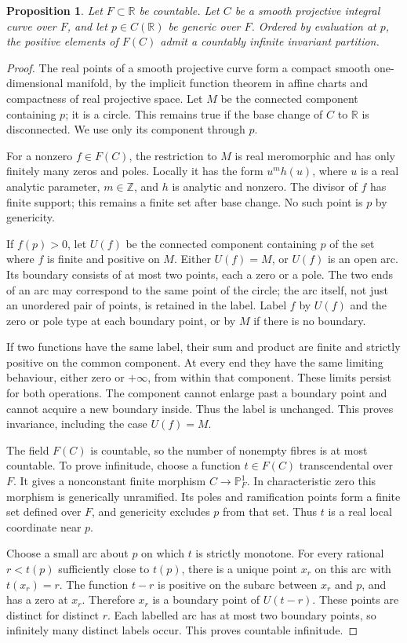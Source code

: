 \documentclass[11pt]{article}
\newtheorem{proposition}[theorem]{Proposition}
\theoremstyle{remark}
\newcommand{\R}{\mathbb R}
\begin{document}
\begin{proposition}\label{prop:curve}
Let $F\subset\R$ be countable. Let $C$ be a smooth projective integral curve over $F$, and let $p\in C(\R)$ be generic over $F$. Ordered by evaluation at $p$, the positive elements of $F(C)$ admit a countably infinite invariant partition.
\end{proposition}
\begin{proof}
The real points of a smooth projective curve form a compact smooth one-dimensional manifold, by the implicit function theorem in affine charts and compactness of real projective space. Let $M$ be the connected component containing $p$; it is a circle. This remains true if the base change of $C$ to $\R$ is disconnected. We use only its component through $p$.

For a nonzero $f\in F(C)$, the restriction to $M$ is real meromorphic and has only finitely many zeros and poles. Locally it has the form $u^m h(u)$, where $u$ is a real analytic parameter, $m\in\mathbb Z$, and $h$ is analytic and nonzero. The divisor of $f$ has finite support; this remains a finite set after base change. No such point is $p$ by genericity.

If $f(p)>0$, let $U(f)$ be the connected component containing $p$ of the set where $f$ is finite and positive on $M$. Either $U(f)=M$, or $U(f)$ is an open arc. Its boundary consists of at most two points, each a zero or a pole. The two ends of an arc may correspond to the same point of the circle; the arc itself, not just an unordered pair of points, is retained in the label. Label $f$ by $U(f)$ and the zero or pole type at each boundary point, or by $M$ if there is no boundary.

If two functions have the same label, their sum and product are finite and strictly positive on the common component. At every end they have the same limiting behaviour, either zero or $+\infty$, from within that component. These limits persist for both operations. The component cannot enlarge past a boundary point and cannot acquire a new boundary inside. Thus the label is unchanged. This proves invariance, including the case $U(f)=M$.

The field $F(C)$ is countable, so the number of nonempty fibres is at most countable. To prove infinitude, choose a function $t\in F(C)$ transcendental over $F$. It gives a nonconstant finite morphism $C\to\mathbb P^1_F$. In characteristic zero this morphism is generically unramified. Its poles and ramification points form a finite set defined over $F$, and genericity excludes $p$ from that set. Thus $t$ is a real local coordinate near $p$.

Choose a small arc about $p$ on which $t$ is strictly monotone. For every rational $r<t(p)$ sufficiently close to $t(p)$, there is a unique point $x_r$ on this arc with $t(x_r)=r$. The function $t-r$ is positive on the subarc between $x_r$ and $p$, and has a zero at $x_r$. Therefore $x_r$ is a boundary point of $U(t-r)$. These points are distinct for distinct $r$. Each labelled arc has at most two boundary points, so infinitely many distinct labels occur. This proves countable infinitude.
\end{proof}
\end{document}
